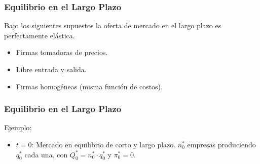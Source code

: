 \documentclass[dvipsnames,table,leqno]{beamer}
\newcommand{\peq}[1]{{\scriptscriptstyle{#1}}}
\begin{document}
\begin{frame}
\begin{figure}[htbp!]
\begin{subfigure}[b]{0.32\textwidth}
				\end{subfigure}
			\end{figure}	
		\end{frame}	

		\begin{frame}
			\frametitle{Equilibrio en el Largo Plazo}
			Bajo los siguientes supuestos la oferta de mercado en el largo plazo es perfectamente elástica.
				\begin{itemize}
					\item Firmas tomadoras de precios.
					\item Libre entrada y salida.
					\item Firmas homogéneas (misma función de costos).
				\end{itemize}
		\end{frame}

		\begin{frame}
			\frametitle{Equilibrio en el Largo Plazo}
			Ejemplo:
				\begin{itemize}
					\item $t=0$: Mercado en equilibrio de corto y largo plazo. $n^\peq{*}_\peq{0}$ empresas produciendo $q^\peq{*}_\peq{0}$ cada una, con $Q^\peq{*}_\peq{0}=n^\peq{*}_\peq{0}\cdot q^\peq{*}_\peq{0}$ y $\pi^\peq{*}_\peq{0}=0$.
				\end{itemize}
		\end{frame}
\end{document}
